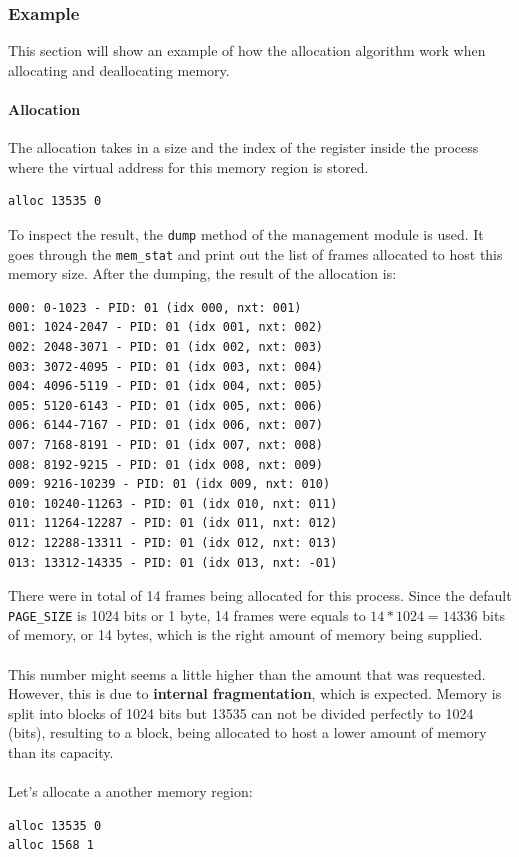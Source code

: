 \documentclass[]{article}
\begin{document}
\subsubsection{Example}
This section will show an example of how the allocation algorithm work when allocating and deallocating memory.
\paragraph{Allocation}
The allocation takes in a size and the index of the register inside the process where the virtual address for this memory region is stored.
\begin{lstlisting}
alloc 13535 0
\end{lstlisting}
To inspect the result, the \lstinline|dump| method of the management module is used. It goes through the \lstinline|mem_stat| and print out the list of frames allocated to host this memory size. After the dumping, the result of the allocation is:
\begin{lstlisting}
000: 0-1023 - PID: 01 (idx 000, nxt: 001)
001: 1024-2047 - PID: 01 (idx 001, nxt: 002)
002: 2048-3071 - PID: 01 (idx 002, nxt: 003)
003: 3072-4095 - PID: 01 (idx 003, nxt: 004)
004: 4096-5119 - PID: 01 (idx 004, nxt: 005)
005: 5120-6143 - PID: 01 (idx 005, nxt: 006)
006: 6144-7167 - PID: 01 (idx 006, nxt: 007)
007: 7168-8191 - PID: 01 (idx 007, nxt: 008)
008: 8192-9215 - PID: 01 (idx 008, nxt: 009)
009: 9216-10239 - PID: 01 (idx 009, nxt: 010)
010: 10240-11263 - PID: 01 (idx 010, nxt: 011)
011: 11264-12287 - PID: 01 (idx 011, nxt: 012)
012: 12288-13311 - PID: 01 (idx 012, nxt: 013)
013: 13312-14335 - PID: 01 (idx 013, nxt: -01)
\end{lstlisting}
There were in total of 14 frames being allocated for this process. Since the default \lstinline|PAGE_SIZE| is 1024 bits or 1 byte, 14 frames were equals to $14*1024=14336$ bits of memory, or 14 bytes, which is the right amount of memory being supplied. \\
\\
This number might seems a little higher than the amount that was requested. However, this is due to \textbf{internal fragmentation}, which is expected. Memory is split into blocks of 1024 bits but 13535 can not be divided perfectly to 1024 (bits), resulting to a block, being allocated to host a lower amount of memory than its capacity.\\
\\
Let's allocate a another memory region:
\begin{lstlisting}
alloc 13535 0
alloc 1568 1
\end{lstlisting}
\end{document}
